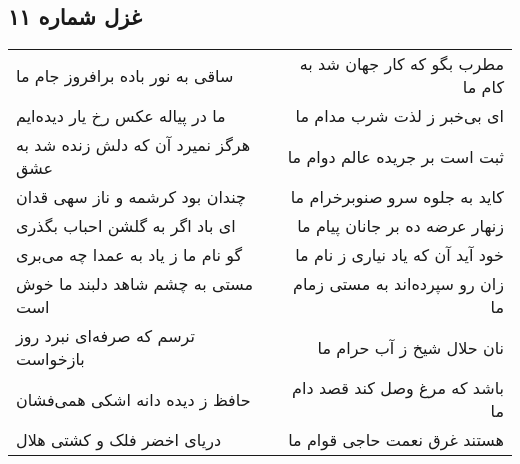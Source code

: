 \begin{center}
\section*{غزل شماره ۱۱}
\label{sec:sh011}
\begin{longtable}{l p{0.5cm} r}
ساقی به نور باده برافروز جام ما
&&
مطرب بگو که کار جهان شد به کام ما
\\
ما در پیاله عکس رخ یار دیده‌ایم
&&
ای بی‌خبر ز لذت شرب مدام ما
\\
هرگز نمیرد آن که دلش زنده شد به عشق
&&
ثبت است بر جریده عالم دوام ما
\\
چندان بود کرشمه و ناز سهی قدان
&&
کاید به جلوه سرو صنوبرخرام ما
\\
ای باد اگر به گلشن احباب بگذری
&&
زنهار عرضه ده بر جانان پیام ما
\\
گو نام ما ز یاد به عمدا چه می‌بری
&&
خود آید آن که یاد نیاری ز نام ما
\\
مستی به چشم شاهد دلبند ما خوش است
&&
زان رو سپرده‌اند به مستی زمام ما
\\
ترسم که صرفه‌ای نبرد روز بازخواست
&&
نان حلال شیخ ز آب حرام ما
\\
حافظ ز دیده دانه اشکی همی‌فشان
&&
باشد که مرغ وصل کند قصد دام ما
\\
دریای اخضر فلک و کشتی هلال
&&
هستند غرق نعمت حاجی قوام ما
\\
\end{longtable}
\end{center}
